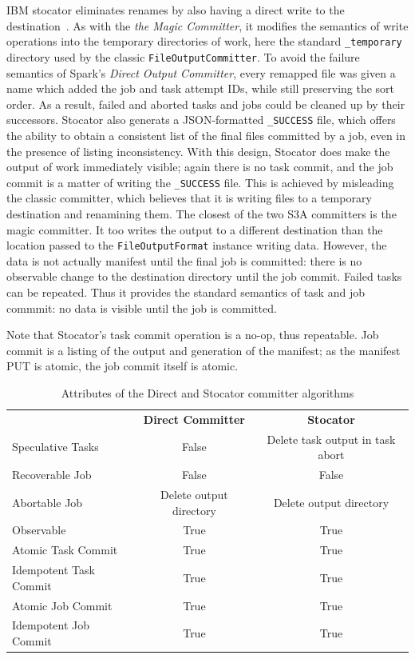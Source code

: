 \documentclass[9pt,technote]{IEEEtran}
\begin{document}
IBM stocator eliminates renames by also having a direct write to the
destination\ \cite{DBLP:journals/corr/abs-1709-01812}.
As with the \emph{the Magic Committer}, it modifies the semantics of write
operations into the temporary directories of work, here the standard
\texttt{\_temporary} directory used by the classic \texttt{FileOutputCommitter}.
To avoid the failure semantics of Spark's \emph{Direct Output Committer},
every remapped file was given a name which added the job and task attempt IDs,
while still preserving the sort order.
As a result, failed and aborted tasks and jobs could be cleaned up by their successors.
Stocator also generats a JSON-formatted \texttt{\_SUCCESS} file, which offers
the ability to obtain a consistent list of the final files committed by a job,
even in the presence of listing inconsistency.
With this design, Stocator does make the output of work immediately visible;
again there is no task commit, and the job commit is a matter of writing
the \texttt{\_SUCCESS} file.
This is achieved by misleading the classic committer, which believes that
it is writing files to a temporary destination and renamining them.
The closest of the two S3A committers is the magic committer.
It too writes the output to a different destination than the location passed
to the \texttt{FileOutputFormat} instance writing data.
However, the data is not actually manifest until the final job is committed:
there is no observable change to the destination directory until the job commit.
Failed tasks can be repeated.
Thus it provides the standard semantics of task and job commmit: no data is
visible until the job is committed.

Note that Stocator's task commit operation is a no-op, thus repeatable.
Job commit is a listing of the output and generation of the manifest;
as the manifest PUT is atomic, the job commit itself is atomic.

\begin{table}
  \label{tab:other-committer-attributes}
  \begin{tabular}{ l c c }
    \hline
    & \textbf{Direct Committer} & \textbf{Stocator} \\
    Speculative Tasks & False & Delete task output in task abort \\
    Recoverable Job & False & False \\
    Abortable Job & Delete output directory & Delete output directory \\
    Observable & True & True \\
    Atomic Task Commit & True & True \\
    Idempotent Task Commit & True & True \\
    Atomic Job Commit & True & True \\
    Idempotent Job Commit & True & True \\
    \hline
  \end{tabular}
  \caption{Attributes of the Direct and Stocator committer algorithms}
\end{table}
\end{document}

